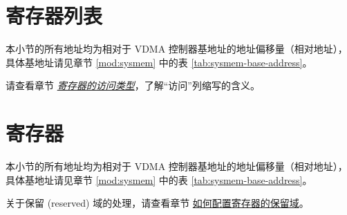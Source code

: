 \documentclass[main\_\_CN.tex]{subfiles}
\begin{document}



\newpage
\hypertarget{VDMA-reg-summ}{}
\section{寄存器列表}
\label{sec:VDMA-reg-summ}

本小节的所有地址均为相对于 VDMA 控制器基地址的地址偏移量（相对地址），具体基地址请见章节 \ref{mod:sysmem} \textit{} 中的表 \ref{tab:sysmem-base-address}。

请查看章节 \hyperref[glossary-access-types]{\textit{寄存器的访问类型}}，了解“访问”列缩写的含义。






\newpage
\section{寄存器}

本小节的所有地址均为相对于 VDMA 控制器基地址的地址偏移量（相对地址），具体基地址请见章节 \ref{mod:sysmem} \textit{} 中的表 \ref{tab:sysmem-base-address}。

关于保留 (reserved) 域的处理，请查看章节 \hyperref[programming-reserved-field]{如何配置寄存器的保留域}。


\end{document}
